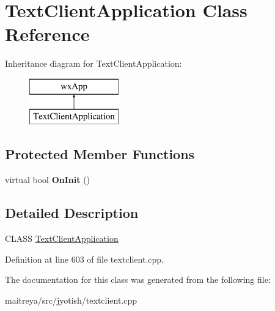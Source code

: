 \hypertarget{classTextClientApplication}{\section{Text\-Client\-Application Class Reference}
\label{classTextClientApplication}
}
Inheritance diagram for Text\-Client\-Application\-:\begin{figure}[H]
\begin{center}
\leavevmode
\includegraphics[height=2.000000cm]{classTextClientApplication}
\end{center}
\end{figure}
\subsection*{Protected Member Functions}
\begin{DoxyCompactItemize}
\item 
\hypertarget{classTextClientApplication_a5eac49543d4ab7a83a4b744039dabd4e}{virtual bool {\bfseries On\-Init} ()}\label{classTextClientApplication_a5eac49543d4ab7a83a4b744039dabd4e}

\end{DoxyCompactItemize}


\subsection{Detailed Description}
C\-L\-A\-S\-S \hyperlink{classTextClientApplication}{Text\-Client\-Application} 

Definition at line 603 of file textclient.\-cpp.



The documentation for this class was generated from the following file\-:\begin{DoxyCompactItemize}
\item 
maitreya/src/jyotish/textclient.\-cpp\end{DoxyCompactItemize}
